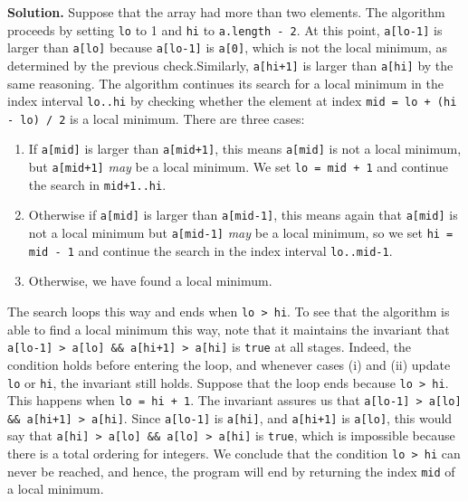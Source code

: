 \documentclass[12pt, a4paper]{article}
\newenvironment{sol}[1][Solution]
{\par\medskip\noindent \textbf{#1.} }
{\medskip}
\begin{document}
\begin{sol}
		Suppose that the array had more than two elements. The algorithm proceeds by setting
		\texttt{lo} to 1 and \texttt{hi} to \texttt{a.length - 2}. At this point, \texttt{a[lo-1]}
		is larger than \texttt{a[lo]} because \texttt{a[lo-1]} is \texttt{a[0]}, which is not
		the local minimum, as determined by the previous check.Similarly, \texttt{a[hi+1]} is
		larger than \texttt{a[hi]} by the same reasoning. The algorithm continues its search
		for a local minimum in the index interval \texttt{lo..hi} by checking whether
		the element at index \texttt{mid = lo + (hi - lo) / 2} is a local minimum. There are
		three cases:
		\begin{enumerate}[label=(\roman*)]
			\item If \texttt{a[mid]} is larger than \texttt{a[mid+1]}, this means \texttt{a[mid]}
			is not a local minimum, but \texttt{a[mid+1]} \emph{may} be a local minimum.
			We set \texttt{lo = mid + 1} and continue the search in \texttt{mid+1..hi}.
			\item Otherwise if \texttt{a[mid]} is larger than \texttt{a[mid-1]}, this
			means again that \texttt{a[mid]} is not a local minimum but \texttt{a[mid-1]}
			\emph{may} be a local minimum, so we set \texttt{hi = mid - 1} and continue the
			search in the index interval \texttt{lo..mid-1}.
			\item Otherwise, we have found a local minimum.
		\end{enumerate}
		The search loops this way and ends when \texttt{lo > hi}. To see that the algorithm is
		able to find a local minimum this way, note that it maintains the invariant that
		\texttt{a[lo-1] > a[lo] \&\& a[hi+1] > a[hi]} is \texttt{true} at all stages.
		Indeed, the condition holds before entering the loop, and whenever cases (i) and (ii)
		update \texttt{lo} or \texttt{hi}, the invariant still holds. Suppose that the loop
		ends because \texttt{lo > hi}. This happens when \texttt{lo = hi + 1}. The invariant
		assures us that \texttt{a[lo-1] > a[lo] \&\& a[hi+1] > a[hi]}. Since \texttt{a[lo-1]} is
		\texttt{a[hi]}, and \texttt{a[hi+1]} is \texttt{a[lo]}, this would say that
		\texttt{a[hi] > a[lo] \&\& a[lo] > a[hi]} is \texttt{true}, which is impossible
		because there is a total ordering for integers. We conclude that the condition
		\texttt{lo > hi} can never be reached, and hence, the program will end by returning
		the index \texttt{mid} of a local minimum.
	\end{sol}
	\pagebreak
	\printbibliography
\end{document}
